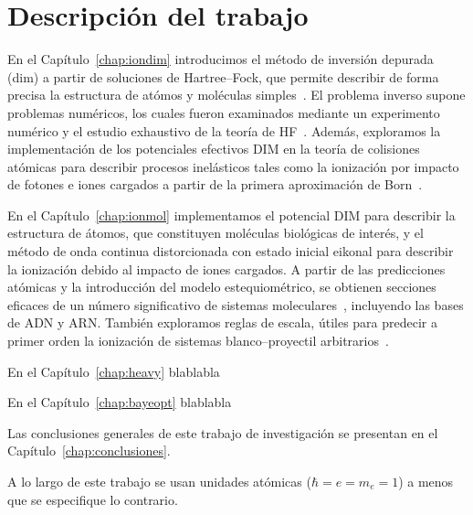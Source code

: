 
\section{Descripción del trabajo}

En el Capítulo~\ref{chap:iondim} introducimos el método de inversión 
depurada (\acs{dim}) a partir de soluciones de Hartree--Fock, que 
permite describir de forma precisa la estructura de atómos y moléculas 
simples~\cite{Mendez:16,Mendez:19dim}. El problema inverso supone 
problemas numéricos, los cuales fueron examinados mediante un 
experimento numérico y el estudio exhaustivo de la teoría de 
HF~\cite{Mendez:18,Mitnik:19}. Además, exploramos la implementación de 
los potenciales efectivos DIM en la teoría de colisiones atómicas para 
describir procesos inelásticos tales como la ionización por impacto de 
fotones e iones cargados a partir de la primera aproximación de 
Born~\cite{Mendez:19dim}. 

En el Capítulo~\ref{chap:ionmol} implementamos el potencial DIM para 
describir la estructura de átomos, que constituyen moléculas biológicas 
de interés, y el método de onda continua distorcionada con estado 
inicial eikonal para describir la ionización debido al impacto de iones 
cargados. A partir de las predicciones atómicas y la introducción del 
modelo estequiométrico, se obtienen secciones eficaces de un número 
significativo de sistemas moleculares~\cite{Mendez:20ionmol}, incluyendo 
las bases de ADN y ARN. También exploramos reglas de escala, útiles 
para predecir a primer orden la ionización de sistemas blanco--proyectil 
arbitrarios~\cite{Mendez:20scale}. 

En el Capítulo~\ref{chap:heavy} blablabla

En el Capítulo~\ref{chap:bayeopt} blablabla

Las conclusiones generales de este trabajo de investigación se presentan 
en el Capítulo~\ref{chap:conclusiones}.

A lo largo de este trabajo se usan unidades atómicas ($\hbar=e=m_e=1$)
a menos que se especifique lo contrario.


